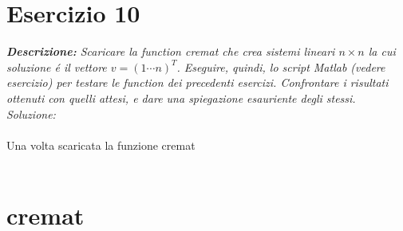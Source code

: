 \section{Esercizio 10}
\textit{\textbf{Descrizione:} Scaricare la function cremat che crea sistemi lineari $n \times n$ la cui soluzione \'e il vettore $v = (1 \cdots n)^{T}$. Eseguire, quindi, lo script Matlab (vedere esercizio) per testare le function dei precedenti esercizi. Confrontare i risultati ottenuti con quelli attesi, e dare una spiegazione esauriente degli stessi.}\newline
\noindent\emph{Soluzione: }
\\~\\
Una volta scaricata la funzione cremat
\\~\\

\section*{cremat}


